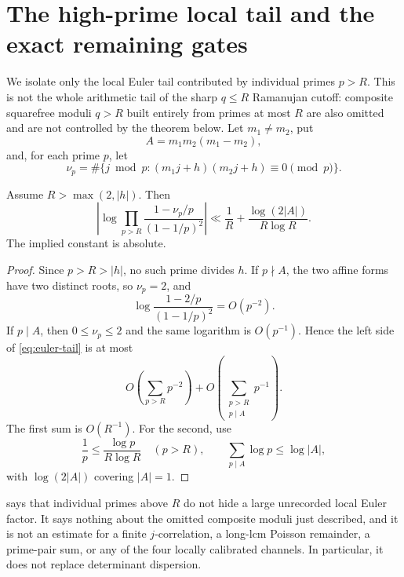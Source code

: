 \section{The high-prime local tail and the exact remaining gates}
\label{sec:gates}

We isolate only the local Euler tail contributed by individual primes
\(p>R\).  This is not the whole arithmetic tail of the sharp
\(q\le R\) Ramanujan cutoff: composite squarefree moduli \(q>R\)
built entirely from primes at most \(R\) are also omitted and are not
controlled by the theorem below.  Let \(m_1\ne m_2\), put
\begin{equation}
 A=m_1m_2(m_1-m_2),
 \label{eq:A-discriminant}
\end{equation}
and, for each prime \(p\), let
\begin{equation}
 \nu_p=\#\{j\bmod p:(m_1j+h)(m_2j+h)\equiv0\pmod p\}.
 \label{eq:nu-p}
\end{equation}

\begin{theorem}
\label{thm:euler-tail}
Assume \(R>\max(2,|h|)\).  Then
\begin{equation}
 \left|
 \log\prod_{p>R}
 \frac{1-\nu_p/p}{(1-1/p)^2}
 \right|
 \ll
 \frac1R+
 \frac{\log(2|A|)}{R\log R}.
 \label{eq:euler-tail}
\end{equation}
The implied constant is absolute.
\end{theorem}

\begin{proof}
Since \(p>R>|h|\), no such prime divides \(h\).  If \(p\nmid A\),
the two affine forms have two distinct roots, so \(\nu_p=2\), and
\begin{equation}
 \log\frac{1-2/p}{(1-1/p)^2}=O(p^{-2}).
 \label{eq:generic-euler-factor}
\end{equation}
If \(p\mid A\), then \(0\le\nu_p\le2\) and the same logarithm is
\(O(p^{-1})\).  Hence the left side of \eqref{eq:euler-tail} is at
most
\[
 O\!\left(\sum_{p>R}p^{-2}\right)
 +O\!\left(\sum_{\substack{p>R\\p\mid A}}p^{-1}\right).
\]
The first sum is \(O(R^{-1})\).  For the second, use
\[
 \frac1p\le\frac{\log p}{R\log R}
 \quad(p>R),
 \qquad
 \sum_{p\mid A}\log p\le\log|A|,
\]
with \(\log(2|A|)\) covering \(|A|=1\).
\end{proof}

\begin{remark}
 says that individual primes above \(R\) do not
hide a large unrecorded local Euler factor.  It says nothing about the
omitted composite moduli just described, and it is not an estimate for a
finite \(j\)-correlation, a long-lcm Poisson remainder, a prime-pair
sum, or any of the four locally calibrated channels.  In particular,
it does not
replace determinant dispersion.
\end{remark}

